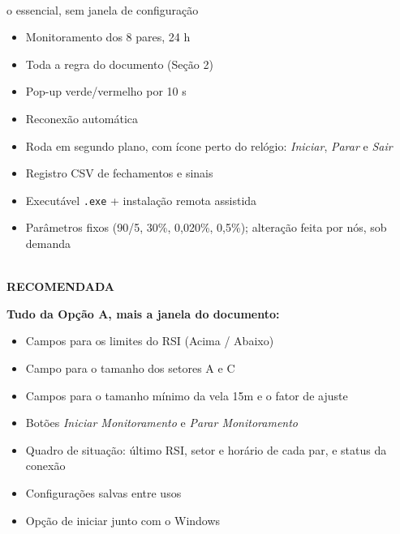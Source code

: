 \documentclass[11pt,a4paper]{article}
\newcommand{\icoCheck} {\textcolor{sinalW}{\ding{51}}}
\newcommand{\icoCross} {\textcolor{sinalZ}{\ding{55}}}
\newcommand{\valA}{999,00}
\newcommand{\valB}{1.799,00}
\begin{document}
\begin{tcbraster}[raster columns=2, raster equal height, raster column skip=5mm]
  \begin{tcolorbox}[opcao, title={Opção A --- Essencial}]
    \centering{\color{navymid}\Large\bfseries R\$ \valA}\\[1mm]
    {\scriptsize\color{txtgray} o essencial, sem janela de configuração}\par\vspace{2mm}\raggedright
    \small
    \begin{itemize}[leftmargin=1.3em, itemsep=2pt, topsep=0pt]
      \item[\icoCheck] Monitoramento dos 8 pares, 24 h
      \item[\icoCheck] Toda a regra do documento (Seção 2)
      \item[\icoCheck] Pop-up verde/vermelho por 10 s
      \item[\icoCheck] Reconexão automática
      \item[\icoCheck] Roda em segundo plano, com ícone perto do relógio: \emph{Iniciar}, \emph{Parar} e \emph{Sair}
      \item[\icoCheck] Registro CSV de fechamentos e sinais
      \item[\icoCheck] Executável \texttt{.exe} + instalação remota assistida
      \item[\icoCross] Parâmetros fixos (90/5, 30\%, 0,020\%, 0,5\%); alteração feita por nós, sob demanda
    \end{itemize}
  \end{tcolorbox}
  \begin{tcolorbox}[opcaorec, title={Opção B --- Completa}]
    \centering{\color{golddk}\Large\bfseries R\$ \valB}\\[1mm]
    {\scriptsize\bfseries\color{golddk} RECOMENDADA }\par\vspace{2mm}\raggedright
    \small
    \textbf{Tudo da Opção A, mais a janela do documento:}
    \begin{itemize}[leftmargin=1.3em, itemsep=2pt, topsep=2pt]
      \item[\icoCheck] Campos para os limites do RSI (Acima / Abaixo)
      \item[\icoCheck] Campo para o tamanho dos setores A e C
      \item[\icoCheck] Campos para o tamanho mínimo da vela 15m e o fator de ajuste
      \item[\icoCheck] Botões \emph{Iniciar Monitoramento} e \emph{Parar Monitoramento}
      \item[\icoCheck] Quadro de situação: último RSI, setor e horário de cada par, e status da conexão
      \item[\icoCheck] Configurações salvas entre usos
      \item[\icoCheck] Opção de iniciar junto com o Windows
    \end{itemize}
  \end{tcolorbox}
\end{tcbraster}
\end{document}
